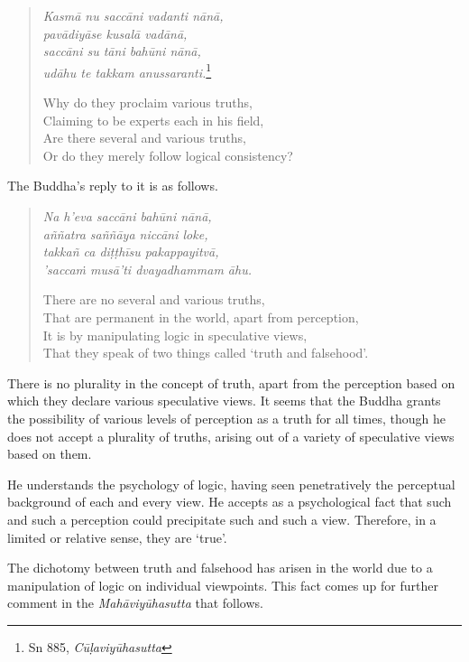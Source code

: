 \begin{quote}
\emph{Kasmā nu saccāni vadanti nānā,}\\
\emph{pavādiyāse kusalā vadānā,}\\
\emph{saccāni su tāni bahūni nānā,}\\
\emph{udāhu te takkam anussaranti.}\footnote{Sn 885, \emph{Cūḷaviyūhasutta}}

Why do they proclaim various truths,\\
Claiming to be experts each in his field,\\
Are there several and various truths,\\
Or do they merely follow logical consistency?
\end{quote}

The Buddha's reply to it is as follows.

\begin{quote}
\emph{Na h'eva saccāni bahūni nānā,}\\
\emph{aññatra saññāya niccāni loke,}\\
\emph{takkañ ca diṭṭhīsu pakappayitvā,}\\
\emph{'saccaṁ musā'ti dvayadhammam āhu.}

There are no several and various truths,\\
That are permanent in the world, apart from perception,\\
It is by manipulating logic in speculative views,\\
That they speak of two things called `truth and falsehood'.
\end{quote}

There is no plurality in the concept of truth, apart from the perception based on which they declare various speculative views. It seems that the Buddha grants the possibility of various levels of perception as a truth for all times, though he does not accept a plurality of truths, arising out of a variety of speculative views based on them.

He understands the psychology of logic, having seen penetratively the perceptual background of each and every view. He accepts as a psychological fact that such and such a perception could precipitate such and such a view. Therefore, in a limited or relative sense, they are `true'.

The dichotomy between truth and falsehood has arisen in the world due to a manipulation of logic on individual viewpoints. This fact comes up for further comment in the \emph{Mahāviyūhasutta} that follows.

